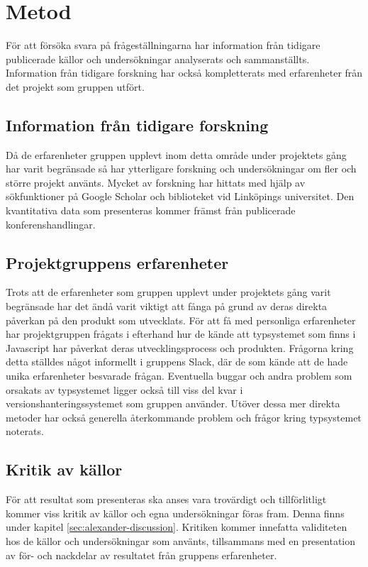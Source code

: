 \section{Metod}
\label{sec:alexander-method}

För att försöka svara på frågeställningarna har information från tidigare publicerade källor och undersökningar analyserats och sammanställts. Information från tidigare forskning har också kompletterats med erfarenheter från det projekt som gruppen utfört. 

\subsection{Information från tidigare forskning}

Då de erfarenheter gruppen upplevt inom detta område under projektets gång har varit begränsade så har ytterligare forskning och undersökningar om fler och större projekt använts. Mycket av forskning har hittats med hjälp av sökfunktioner på Google Scholar och biblioteket vid Linköpings universitet. Den kvantitativa data som presenteras kommer främst från publicerade konferenshandlingar.

\subsection{Projektgruppens erfarenheter}
Trots att de erfarenheter som gruppen upplevt under projektets gång varit begränsade har det ändå varit viktigt att fånga på grund av deras direkta påverkan på den produkt som utvecklats. För att få med personliga erfarenheter har projektgruppen frågats i efterhand hur de kände att typsystemet som finns i Javascript har påverkat deras utvecklingsprocess och produkten. Frågorna kring detta ställdes något informellt i gruppens Slack, där de som kände att de hade unika erfarenheter besvarade frågan. Eventuella buggar och andra problem som orsakats av typsystemet ligger också till viss del kvar i versionshanteringssystemet som gruppen använder. Utöver dessa mer direkta metoder har också generella återkommande problem och frågor kring typsystemet noterats.

\subsection{Kritik av källor}
För att resultat som presenteras ska anses vara trovärdigt och tillförlitligt kommer viss kritik av källor och egna undersökningar föras fram. Denna finns under kapitel \ref{sec:alexander-discussion}. Kritiken kommer innefatta validiteten hos de källor och undersökningar som använts, tillsammans med en presentation av för- och nackdelar av resultatet från gruppens erfarenheter. 